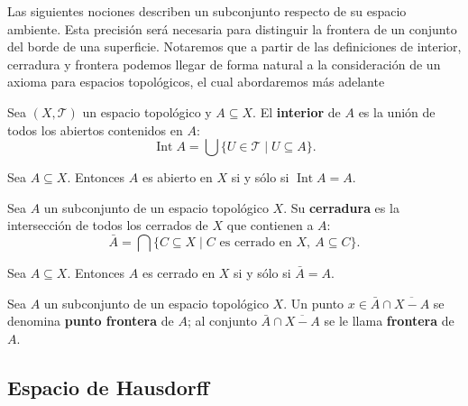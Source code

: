 Las siguientes nociones describen un subconjunto respecto de su espacio ambiente. Esta precisión será necesaria para distinguir la frontera de un conjunto del borde de una superficie.
Notaremos que a partir de las definiciones de interior, cerradura y frontera podemos llegar de
forma natural a la consideración de un axioma para espacios topológicos, el cual abordaremos
más adelante

\begin{definition}
\label{def:interior}
Sea $(X,\mathcal{T})$ un espacio topológico y $A\subseteq X$. El \textbf{interior} de $A$ es la unión de todos los abiertos contenidos en $A$:
\[
\operatorname{Int}A=\bigcup\{U\in\mathcal{T}\mid U\subseteq A\}.
\]
\end{definition}

\begin{proposition}
\label{prop:abierto-interior}
Sea $A\subseteq X$. Entonces $A$ es abierto en $X$ si y sólo si $\operatorname{Int}A=A$.
\end{proposition}

\begin{definition}
\label{def:cerradura}
Sea $A$ un subconjunto de un espacio topológico $X$. Su \textbf{cerradura} es la intersección de todos los cerrados de $X$ que contienen a $A$:
\[
\bar A=\bigcap\{C\subseteq X\mid C\text{ es cerrado en }X,\ A\subseteq C\}.
\]
\end{definition}

\begin{proposition}
\label{prop:cerrado-cerradura}
Sea $A\subseteq X$. Entonces $A$ es cerrado en $X$ si y sólo si $\bar A=A$.
\end{proposition}

\begin{definition}
\label{def:frontera}
Sea $A$ un subconjunto de un espacio topológico $X$. Un punto $x \in \bar{A} \cap \overline{X-A} $ se denomina \textbf{punto frontera} de $A$; al conjunto  $\bar{A} \cap \overline{X-A}$ se le llama \textbf{frontera} de $A$.
\end{definition}

\subsection{Espacio de Hausdorff}


